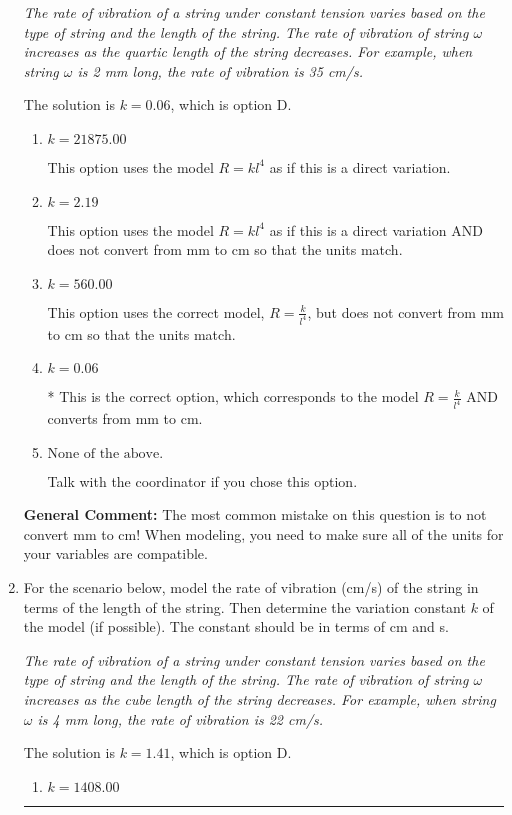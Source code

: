 \documentclass{extbook}[14pt]
\newcommand{\litem}[1]{\item #1

\rule{\textwidth}{0.4pt}}
\begin{document}
\begin{enumerate}
{\begin{center}
    \textit{ The rate of vibration of a string under constant tension varies based on the type of string and the length of the string. The rate of vibration of string $\omega$ increases as the quartic length of the string decreases. For example, when string $\omega$ is 2 mm long, the rate of vibration is 35 cm/s. }
\end{center}
The solution is \( k = 0.06 \), which is option D.\begin{enumerate}[label=\Alph*.]
\item \( k = 21875.00 \)

This option uses the model $R = kl^{4}$ as if this is a direct variation.
\item \( k = 2.19 \)

This option uses the model $R = kl^{4}$ as if this is a direct variation AND does not convert from mm to cm so that the units match.
\item \( k = 560.00 \)

This option uses the correct model, $R = \frac{k}{l^{4}}$, but does not convert from mm to cm so that the units match.
\item \( k = 0.06 \)

* This is the correct option, which corresponds to the model $R = \frac{k}{l^{4}}$ AND converts from mm to cm.
\item \( \text{None of the above.} \)

Talk with the coordinator if you chose this option.
\end{enumerate}

\textbf{General Comment:} The most common mistake on this question is to not convert mm to cm! When modeling, you need to make sure all of the units for your variables are compatible.
}
\litem{
For the scenario below, model the rate of vibration (cm/s) of the string in terms of the length of the string. Then determine the variation constant $k$ of the model (if possible). The constant should be in terms of cm and s.

\begin{center}
    \textit{ The rate of vibration of a string under constant tension varies based on the type of string and the length of the string. The rate of vibration of string $\omega$ increases as the cube length of the string decreases. For example, when string $\omega$ is 4 mm long, the rate of vibration is 22 cm/s. }
\end{center}
The solution is \( k = 1.41 \), which is option D.\begin{enumerate}[label=\Alph*.]
\item \( k = 1408.00 \)


\end{enumerate}}
\end{enumerate}
\end{document}
